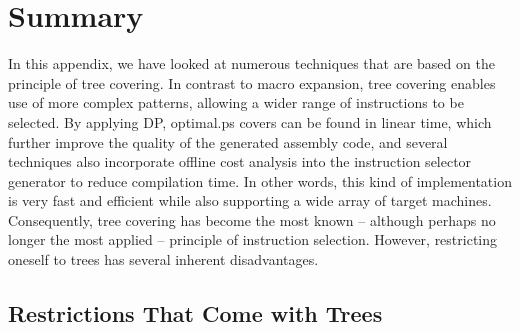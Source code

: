 {\section{Summary}

In this appendix, we have looked at numerous techniques that are based on the
\gls{principle} of \gls{tree covering}.
%
In contrast to \gls{macro expansion}, \gls{tree covering} enables use of more
complex \glspl{pattern}, allowing a wider range of \glspl{instruction} to be
selected.
%
By applying \glsdesc{DP}, \gls{optimal.ps} covers can be found in linear time,
which further improve the quality of the generated \gls{assembly code}, and
several techniques also incorporate \gls{offline cost analysis} into the
\gls{instruction selector} generator to reduce compilation time.
%
In other words, this kind of implementation is very fast and efficient while
also supporting a wide array of \glspl{target machine}.
%
Consequently, \gls{tree covering} has become the most known -- although perhaps
no longer the most applied -- \gls{principle} of \gls{instruction selection}.
%
However, restricting oneself to \glspl{tree} has several inherent disadvantages.


\subsection{Restrictions That Come with Trees}

}
